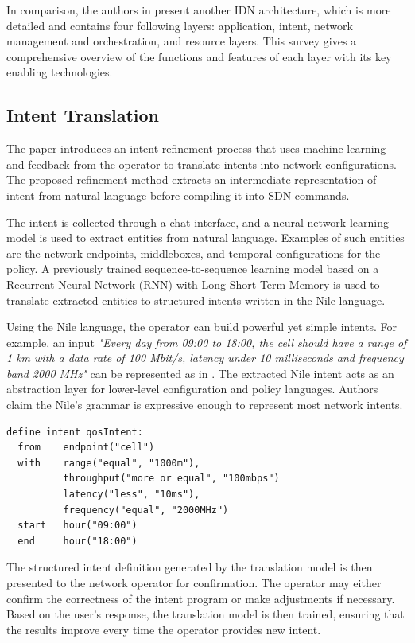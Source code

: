 In comparison, the authors in \cite[13]{Mehmood2021} present another IDN architecture, which is more detailed and contains four following layers: application, intent, network management and orchestration, and resource layers. This survey gives a comprehensive overview of the functions and features of each layer with its key enabling technologies.


\subsection{Intent Translation}

The paper \cite{Jacobs2018} introduces an intent-refinement process that uses machine learning and feedback from the operator to translate intents into network configurations. The proposed refinement method extracts an intermediate representation of intent from natural language before compiling it into SDN commands.

The intent is collected through a chat interface, and a neural network learning model is used to extract entities from natural language. Examples of such entities are the network endpoints, middleboxes, and temporal configurations for the policy. A previously trained sequence-to-sequence learning model based on a Recurrent Neural Network (RNN) with Long Short-Term Memory is used to translate extracted entities to structured intents written in the Nile language. 

Using the Nile language, the operator can build powerful yet simple intents. For example, an input \textit{"Every day from 09:00 to 18:00, the cell should have a range of 1 km with a data rate of 100 Mbit/s, latency under 10 milliseconds and frequency band 2000 MHz"} can be represented as in . The extracted Nile intent acts as an abstraction layer for lower-level configuration and policy languages. Authors claim the Nile's grammar is expressive enough to represent most network intents.

\begin{lstlisting}[language=Nile,float=ht,caption={Nile intent example. \cite{Jacobs2018} },label=lst:nile_intent_example]
define intent qosIntent:
  from    endpoint("cell")
  with    range("equal", "1000m"),
          throughput("more or equal", "100mbps")
          latency("less", "10ms"),
          frequency("equal", "2000MHz")
  start   hour("09:00")
  end     hour("18:00")
\end{lstlisting}

The structured intent definition generated by the translation model is then presented to the network operator for confirmation. The operator may either confirm the correctness of the intent program or make adjustments if necessary. Based on the user’s response, the translation model is then trained, ensuring that the results improve every time the operator provides new intent.

